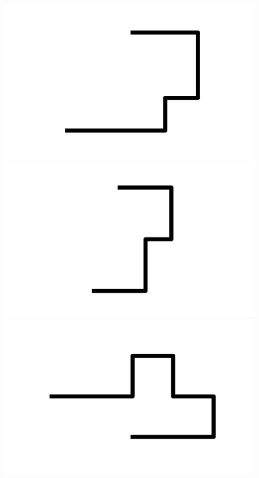 \documentclass[]{report}
\begin{document}
\includegraphics[scale=.1]{pictures/21/state_cluster_shapes_295.pdf} 
\includegraphics[scale=.1]{pictures/21/state_cluster_shapes_296.pdf} 
\includegraphics[scale=.1]{pictures/21/state_cluster_shapes_297.pdf} 
\end{document}
